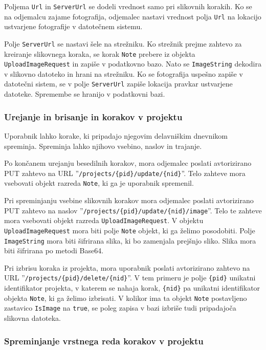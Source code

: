 \documentclass[a4paper, 12pt]{book}
\begin{document}
Poljema \texttt{Url} in \texttt{ServerUrl} se dodeli vrednost samo pri slikovnih korakih.
Ko se na odjemalcu zajame fotografija, odjemalec nastavi vrednost polja \texttt{Url} na lokacijo ustvarjene fotografije v datotečnem sistemu.

Polje \texttt{ServerUrl} se nastavi šele na strežniku.
Ko strežnik prejme zahtevo za kreiranje slikovnega koraka, se korak \texttt{Note} prebere iz objekta \texttt{UploadImageRequest} in zapiše v podatkovno bazo.
Nato se \texttt{ImageString} dekodira v slikovno datoteko in hrani na strežniku.
Ko se fotografija uspešno zapiše v datotečni sistem, se v polje \texttt{ServerUrl} zapiše lokacija pravkar ustvarjene datoteke.
Spremembe se hranijo v podatkovni bazi.

\subsubsection{Urejanje in brisanje in korakov v projektu}

Uporabnik lahko korake, ki pripadajo njegovim delavniškim dnevnikom spreminja.
Spreminja lahko njihovo vsebino, naslov in trajanje.

Po končanem urejanju besedilnih korakov, mora odjemalec poslati avtorizirano PUT zahtevo na URL ''\texttt{/projects/\{pid\}/update/\{nid\}}''.
Telo zahteve mora vsebovati objekt razreda \texttt{Note}, ki ga je uporabnik spremenil.

Pri spreminjanju vsebine slikovnih korakov mora odjemalec poslati avtorizirano PUT zahtevo na naslov ''\texttt{/projects/\{pid\}/update/\{nid\}/image}''.
Telo te zahteve mora vsebovati objekt razreda \texttt{UploadImageRequest}.
V objektu \texttt{UploadImageRequest} mora biti polje \texttt{Note} objekt, ki ga želimo posodobiti.
Polje \texttt{ImageString} mora biti šifrirana slika, ki bo zamenjala prejšnjo sliko.
Slika mora biti šifrirana po metodi Base64.

Pri izbrisu koraka iz projekta, mora uporabnik poslati avtorizirano zahtevo na URL ''\texttt{/projects/\{pid\}/delete/\{nid\}}''.
V tem primeru je polje \texttt{\{pid\}} unikatni identifikator projekta, v katerem se nahaja korak, \texttt{\{nid\}} pa unikatni identifikator objekta \texttt{Note}, ki ga želimo izbrisati.
V kolikor ima ta objekt \texttt{Note} postavljeno zastavico \texttt{IsImage} na \texttt{true}, se poleg zapisa v bazi izbriše tudi pripadajoča slikovna datoteka.


\subsubsection{Spreminjanje vrstnega reda korakov v projektu}
\end{document}
